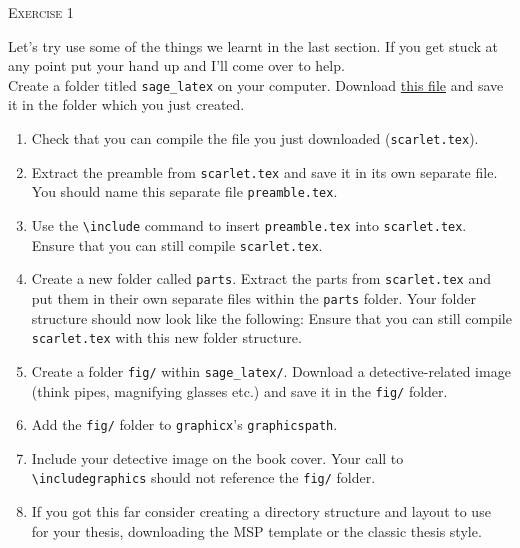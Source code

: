 \documentclass{article}
\begin{document}
\begin{center}
  \Large\textsc{Exercise 1}
\end{center}

\noindent Let's try use some of the things we learnt in the last section. If you
get stuck at any point put your hand up and I'll come over to help.\\

\noindent Create a folder titled \texttt{sage\_latex} on your computer. Download
\href{https://jwalton.info/assets/teaching/latex/scarlet.tex}{this file} 
and save it in the folder which you just created.

\begin{enumerate}
  \item Check that you can compile the file you just downloaded
		(\texttt{scarlet.tex}).

  \item Extract the preamble from \texttt{scarlet.tex} and save it in its own
	  separate file. You should name this separate file
	  \texttt{preamble.tex}.

  \item Use the \texttt{\textbackslash include} command to insert
	  \texttt{preamble.tex} into \texttt{scarlet.tex}. Ensure that you can
	  still compile \texttt{scarlet.tex}.

  \item{Create a new folder called \texttt{parts}. Extract the parts from 
	  \texttt{scarlet.tex} and put them in their own separate files within the
	  \texttt{parts} folder. Your folder structure should now look
	  like the following:
	  \vspace{0.25cm}
	Ensure that you can still compile \texttt{scarlet.tex} with this new 
folder structure.}

  \item Create a folder \texttt{fig/} within \texttt{sage\_latex/}. Download a
	  detective-related image (think pipes, magnifying glasses etc.) and
	  save it in the \texttt{fig/} folder.

  \item Add the \texttt{fig/} folder to \texttt{graphicx}'s
	  \texttt{graphicspath}.

  \item Include your detective image on the book cover. Your call to
	  \texttt{\textbackslash includegraphics} should not reference the \texttt{fig/}
	  folder.

  \item If you got this far consider creating a directory structure and layout
	  to use for your thesis, downloading the MSP template or the classic
	  thesis style.
\end{enumerate}
\end{document}
